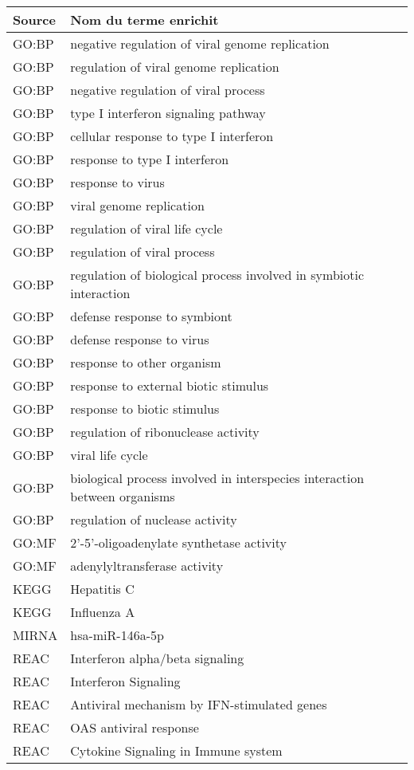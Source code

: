 \begin{longtable}{ll}
\toprule
Source & Nom du terme enrichit\\
\midrule
GO:BP & negative regulation of viral genome replication\\
GO:BP & regulation of viral genome replication\\
GO:BP & negative regulation of viral process\\
GO:BP & type I interferon signaling pathway\\
GO:BP & cellular response to type I interferon\\
GO:BP & response to type I interferon\\
GO:BP & response to virus\\
GO:BP & viral genome replication\\
GO:BP & regulation of viral life cycle\\
GO:BP & regulation of viral process\\
GO:BP & regulation of biological process involved in symbiotic interaction\\
GO:BP & defense response to symbiont\\
GO:BP & defense response to virus\\
GO:BP & response to other organism\\
GO:BP & response to external biotic stimulus\\
GO:BP & response to biotic stimulus\\
GO:BP & regulation of ribonuclease activity\\
GO:BP & viral life cycle\\
GO:BP & biological process involved in interspecies interaction between organisms\\
GO:BP & regulation of nuclease activity\\
GO:MF & 2'-5'-oligoadenylate synthetase activity\\
GO:MF & adenylyltransferase activity\\
KEGG & Hepatitis C\\
KEGG & Influenza A\\
MIRNA & hsa-miR-146a-5p\\
REAC & Interferon alpha/beta signaling\\
REAC & Interferon Signaling\\
REAC & Antiviral mechanism by IFN-stimulated genes\\
REAC & OAS antiviral response\\
REAC & Cytokine Signaling in Immune system\\

\end{longtable}
